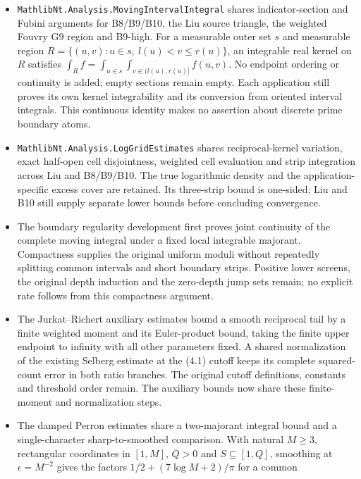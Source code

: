 \begin{itemize}
      dependencies of the current headline counting proof.
\item \texttt{MathlibNt.Analysis.MovingIntervalIntegral} shares indicator-section
      and Fubini arguments for B8/B9/B10, the Liu source triangle, the
      weighted Fouvry G9 region and B9-high. For a measurable outer set
      $s$ and measurable region
      $R=\{(u,v):u\in s,\ l(u)<v\le r(u)\}$, an integrable real kernel on $R$
      satisfies $\int_R f=\int_{u\in s}\int_{v\in(l(u),r(u)]}f(u,v)$.
      No endpoint ordering or continuity is added; empty sections remain
      empty. Each application still proves its own kernel integrability
      and its conversion from oriented interval integrals. This continuous
      identity makes no assertion about discrete prime boundary atoms.
\item \texttt{MathlibNt.Analysis.LogGridEstimates} shares reciprocal-kernel
      variation, exact half-open cell disjointness, weighted cell evaluation
      and strip integration across Liu and B8/B9/B10. The true logarithmic
      density and the application-specific excess cover are retained. Its
      three-strip bound is one-sided; Liu and B10 still supply separate
      lower bounds before concluding convergence.
\item The boundary regularity development first proves joint continuity of
      the complete moving integral under a fixed local integrable majorant.
      Compactness supplies the original uniform moduli without repeatedly
      splitting common intervals and short boundary strips. Positive lower
      screens, the original depth induction and the zero-depth jump sets
      remain; no explicit rate follows from this compactness argument.
\item The Jurkat--Richert auxiliary estimates bound a smooth reciprocal tail
      by a finite weighted moment and its Euler-product bound, taking the
      finite upper endpoint to infinity with all other parameters fixed.
      A shared normalization of the existing Selberg estimate at the (4.1)
      cutoff keeps its complete squared-count error in both ratio branches.
      The original cutoff definitions, constants and threshold order remain.
      The auxiliary bounds now share these finite-moment and normalization steps.
\item The damped Perron estimates share a two-majorant integral bound and a
      single-character sharp-to-smoothed comparison. With natural $M\ge3$, rectangular
      coordinates in $[1,M]$, $Q>0$ and $S\subseteq[1,Q]$, smoothing at
      $\epsilon=M^{-2}$ gives the factors $1/2+(7\log M+2)/\pi$ for a common

\end{itemize}

